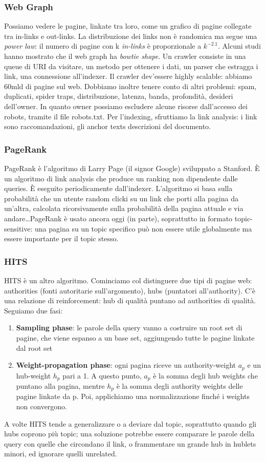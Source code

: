\documentclass[11pt]{article}
\begin{document}
\subsubsection{Web Graph}
Possiamo vedere le pagine, linkate tra loro, come un grafico di pagine collegate tra in-links e out-links. La distribuzione dei links non è randomica ma segue una \textit{power law}: il numero di pagine con k \textit{in-links} è proporzionale a $k^{-2.1}$. Alcuni studi hanno mostrato che il web graph ha \textit{bowtie shape}. 
Un crawler consiste in una queue di URI da visitare, un metodo per ottenere i dati, un parser che estragga i link, una connessione all'indexer. Il crawler dev'essere highly scalable: abbiamo 60mld di pagine sul web. Dobbiamo inoltre tenere conto di altri problemi: spam, duplicati, spider traps, distribuzione, latenza, banda, profondità, desideri dell'owner. In quanto owner possiamo escludere alcune risorse dall'accesso dei robots, tramite il file robots.txt. Per l'indexing, sfruttiamo la link analysis: i link sono raccomandazioni, gli anchor texts descrizioni del documento. 
\subsubsection{PageRank}
PageRank è l'algoritmo di Larry Page (il signor Google) sviluppato a Stanford. È un algoritmo di link analysis che produce un ranking non dipendente dalle queries. È eseguito periodicamente dall'indexer. L'algoritmo si basa sulla probabilità che un utente random clicki su un link che porti alla pagina da un'altra, calcolata ricorsivamente sulla probabilità della pagina attuale e via andare\dots PageRank è usato ancora oggi (in parte), soprattutto in formato topic-sensitive: una pagina su un topic specifico può non essere utile globalmente ma essere importante per il topic stesso. 
\subsubsection{HITS}
HITS è un altro algoritmo. Cominciamo col distinguere due tipi di pagine web: authorities (fonti autoritarie sull'argomento), hubs (puntatori all'authority). C'è una relazione di reinforcement: hub di qualità puntano ad authorities di qualità. Seguiamo due fasi:
\begin{enumerate}
    \item \textbf{Sampling phase}: le parole della query vanno a costruire un root set di pagine, che viene espanso a un base set, aggiungendo tutte le pagine linkate dal root set
    \item \textbf{Weight-propagation phase}: ogni pagina riceve un authority-weight $a_p$ e un hub-weight $h_p$ pari a 1. A questo punto, $a_p$ è la somma degli hub weights che puntano alla pagina, mentre $h_p$ è la somma degli authority weights delle pagine linkate da p. Poi, applichiamo una normalizzazione finché i weights non convergono. 
\end{enumerate} 
A volte HITS tende a generalizzare o a deviare dal topic, soprattutto quando gli hubs coprono più topic; una soluzione potrebbe essere comparare le parole della query con quelle che circondano il link, o frammentare un grande hub in hublets minori, ed ignorare quelli unrelated. 
\end{document}
